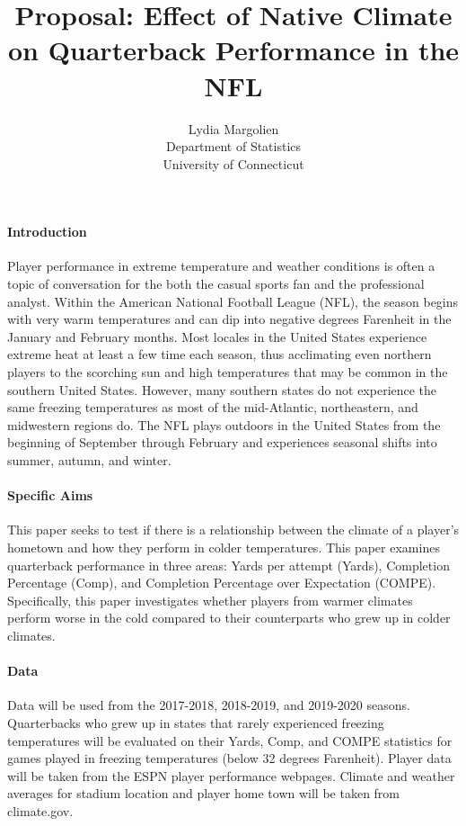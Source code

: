 \documentclass[12pt]{article}
\title{Proposal: Effect of Native Climate on Quarterback Performance in the NFL}
\author{Lydia Margolien\\
  Department of Statistics\\
  University of Connecticut
}
\begin{document}
\maketitle


\paragraph{Introduction}

Player performance in extreme temperature and weather conditions is often a topic of conversation for the both the casual sports fan and the professional analyst. Within the American National Football League (NFL), the season begins with very warm temperatures and can dip into negative degrees Farenheit in the January and February months.  Most locales in the United States experience extreme heat at least a few time each season, thus acclimating even northern players to the scorching sun and high temperatures that may be common in the southern United States. However, many southern states do not experience the same freezing temperatures as most of the mid-Atlantic, northeastern, and midwestern regions do. The NFL plays outdoors in the United States from the beginning of September through February and experiences seasonal shifts into summer, autumn, and winter. 

\lipsum[1] 

\paragraph{Specific Aims}
This paper seeks to test if there is a relationship between the climate of a player's hometown and how they perform in colder temperatures. This paper examines quarterback performance in three areas: Yards per attempt (Yards), Completion Percentage (Comp), and Completion Percentage over Expectation (COMPE). Specifically, this paper investigates whether players from warmer climates perform worse in the cold compared to their counterparts who grew up in colder climates. 

\lipsum[2]

\paragraph{Data}
Data will be used from the 2017-2018, 2018-2019, and 2019-2020 seasons. Quarterbacks who grew up in states that rarely experienced freezing temperatures will be evaluated on their Yards, Comp, and COMPE statistics for games played in freezing temperatures (below 32 degrees Farenheit). Player data will be taken from the ESPN player performance webpages. Climate and weather averages for stadium location and player home town will be taken from climate.gov. 
\end{document}
